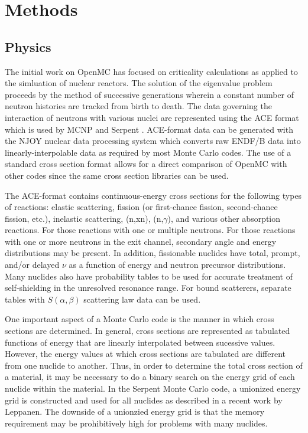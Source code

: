 \documentclass{elsarticle}
\begin{document}
\section{Methods}

\subsection{Physics}

The initial work on OpenMC has focused on criticality calculations as applied to
the simluation of nuclear reactors. The solution of the eigenvalue problem
proceeds by the method of successive generations \cite{lieberoth} wherein a
constant number of neutron histories are tracked from birth to death. The data
governing the interaction of neutrons with various nuclei are represented using
the ACE format \cite{ace-format} which is used by MCNP \cite{mcnp} and Serpent
\cite{serpent}. ACE-format data can be generated with the NJOY nuclear data
processing system which converts raw ENDF/B data into linearly-interpolable data
as required by most Monte Carlo codes. The use of a standard cross section
format allows for a direct comparison of OpenMC with other codes since the same
cross section libraries can be used.

The ACE-format contains continuous-energy cross sections for the following types
of reactions: elastic scattering, fission (or first-chance fission,
second-chance fission, etc.), inelastic scattering, (n,xn), (n,$\gamma$), and
various other absorption reactions. For those reactions with one or multiple
neutrons. For those reactions with one or more neutrons in the exit channel,
secondary angle and energy distributions may be present. In addition,
fissionable nuclides have total, prompt, and/or delayed $\nu$ as a function of
energy and neutron precursor distributions. Many nuclides also have probability
tables to be used for accurate treatment of self-shielding in the unresolved
resonance range. For bound scatterers, separate tables with $S(\alpha,\beta)$
scattering law data can be used.

One important aspect of a Monte Carlo code is the manner in which cross sections
are determined. In general, cross sections are represented as tabulated
functions of energy that are linearly interpolated between sucessive
values. However, the energy values at which cross sections are tabulated are
different from one nuclide to another. Thus, in order to determine the total
cross section of a material, it may be necessary to do a binary search on the
energy grid of each nuclide within the material. In the Serpent Monte Carlo
code, a unionized energy grid is constructed and used for all nuclides as
described in a recent work by Leppanen. The downside of a unionzied energy grid
is that the memory requirement may be prohibitively high for problems with many
nuclides. 
\end{document}
